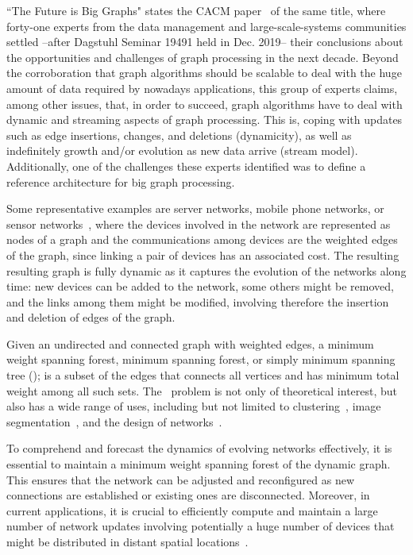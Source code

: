 ``The Future is Big Graphs" states the CACM paper~\cite{sakr2021futureIsBigGraphs} of the same title, where forty-one experts from the data management and large-scale-systems communities settled --after Dagstuhl Seminar 19491 held in Dec. 2019-- their conclusions about the opportunities and challenges of graph processing in the next decade. Beyond the corroboration that graph algorithms should be scalable to deal with the huge amount of data required by nowadays applications, this group of experts claims, among other issues, that, in order to succeed, graph algorithms have to deal with dynamic and streaming aspects of graph processing. This is, coping with updates such as edge insertions, changes, and deletions (dynamicity), as well as indefinitely growth and/or evolution as new data arrive (stream model). Additionally, one of the challenges these experts identified was to define a reference architecture for big graph processing.

Some representative examples are server networks, mobile phone networks, or sensor networks~\cite{Neely2005}, where the devices involved in the network are represented as nodes of a graph and the communications among devices are the weighted edges of the graph, since linking a pair of devices has an associated cost. The resulting resulting graph is fully dynamic as it captures the evolution of the networks along time: new devices can be added to the network, some others might be removed, and the links among them might be modified, involving therefore the insertion and deletion of edges of the graph.

Given an undirected and connected graph with weighted edges, a minimum weight spanning forest, minimum spanning forest, or simply minimum spanning tree (\mst); is a subset of the edges that connects all vertices and has minimum total weight among all such sets. The \mst\ problem is not only of theoretical interest, but also has a wide range of uses, including but not limited to clustering~\cite{AffinityClustering,KHAN20221113}, image segmentation~\cite{Wassenberg2009,LONG2020165308}, and the design of networks~\cite{Li2005}.

To comprehend and forecast the dynamics of evolving networks effectively, it is essential to maintain a minimum weight spanning forest of the dynamic graph. This ensures that the network can be adjusted and reconfigured as new connections are established or existing ones are disconnected. Moreover, in current applications, it is crucial to efficiently compute and maintain a large number of network updates involving potentially a huge number of devices that might be distributed in distant spatial locations~\cite{Tang2009,Tan2010}.


